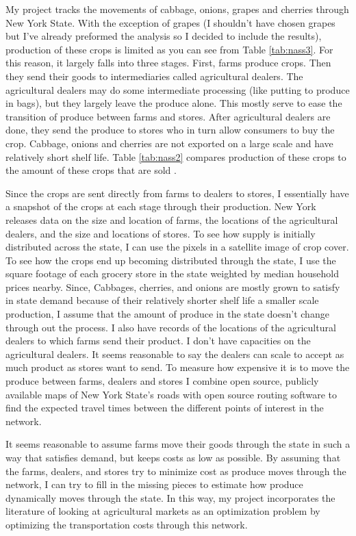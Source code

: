 \documentclass{report}
\begin{document}
My project tracks the movements of cabbage, onions, grapes and cherries through New York State. With the exception of grapes (I shouldn't have chosen grapes but I've already preformed the analysis so I decided to include the results), production of these crops is limited as you can see from Table \ref{tab:nass3}. For this reason, it largely falls into three stages. First, farms produce crops. Then they send their goods to intermediaries called agricultural dealers. The agricultural dealers may do some intermediate processing (like putting to produce in bags), but they largely leave the produce alone. This mostly serve to ease the transition of produce between farms and stores. After agricultural dealers are done, they send the produce to stores who in turn allow consumers to buy the crop. Cabbage, onions and cherries are not exported on a large scale and have relatively short shelf life. Table \ref{tab:nass2} compares production of these crops to the amount of these crops that are sold \cite{nass2}.  

Since the crops are sent directly from farms to dealers to stores, I essentially have a snapshot of the crops at each stage through their production. New York releases data on the size and location of farms, the locations of the agricultural dealers, and the size and locations of stores. To see how supply is initially distributed across the state, I can use the pixels in a satellite image of crop cover. To see how the crops end up becoming distributed through the state, I use the square footage of each grocery store in the state weighted by median household prices nearby.  Since, Cabbages, cherries, and onions are mostly grown to satisfy in state demand because of their relatively shorter shelf life a smaller scale production, I assume that the amount of produce in the state doesn't change through out the process. I also have records of the locations of the agricultural dealers to which farms send their product. I don't have capacities on the agricultural dealers. It seems reasonable to say the dealers can scale to accept as much product as stores want to send. To measure how expensive it is to move the produce between farms, dealers and stores I combine open source, publicly available maps of New York State's roads with open source routing software to find the expected travel times between the different points of interest in the network.  

It seems reasonable to assume farms move their goods through the state in such a way that satisfies demand, but keeps costs as low as possible. By assuming that the farms, dealers, and stores try to minimize cost as produce moves through the network, I can try to fill in the missing pieces to estimate how produce dynamically moves through the state. In this way, my project incorporates the literature of looking at agricultural markets as an optimization problem by optimizing the transportation costs through this network.
\end{document}
